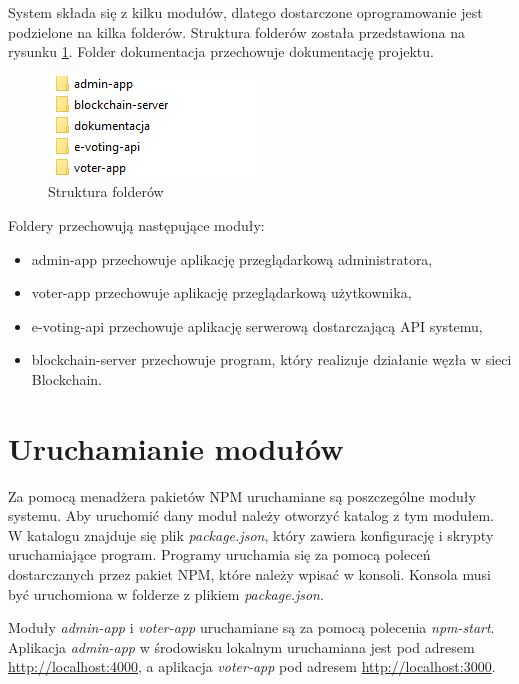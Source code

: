 \documentclass[a4paper,12pt]{book}
\begin{document}
System składa się z kilku modułów, dlatego dostarczone oprogramowanie jest podzielone na kilka folderów. Struktura folderów została przedstawiona na rysunku \ref{foldery}. Folder dokumentacja przechowuje dokumentację projektu.

\begin{figure}[h]
	\centering
	\includegraphics[width=\textwidth]{images/foldery.png}
	\caption{Struktura folderów}\label{foldery}
\end {figure}

Foldery przechowują następujące moduły:
\begin{itemize}
	\item admin-app przechowuje aplikację przeglądarkową administratora,
	\item voter-app przechowuje aplikację przeglądarkową użytkownika,
	\item e-voting-api przechowuje aplikację serwerową dostarczającą API systemu,
	\item blockchain-server przechowuje program, który realizuje działanie węzła w sieci Blockchain.
\end{itemize}

\section{Uruchamianie modułów}

Za pomocą menadżera pakietów NPM uruchamiane są poszczególne moduły systemu. Aby uruchomić dany moduł należy otworzyć katalog z tym modułem. W katalogu znajduje się plik \textit{package.json}, który zawiera konfigurację i skrypty uruchamiające program. Programy uruchamia się za pomocą poleceń dostarczanych przez pakiet NPM, które należy wpisać w konsoli. Konsola musi być uruchomiona w folderze z plikiem \textit{package.json}.

Moduły \textit{admin-app} i \textit{voter-app} uruchamiane są za pomocą polecenia \textit{npm-start}. Aplikacja \textit{admin-app} w środowisku lokalnym uruchamiana jest pod adresem \url{http://localhost:4000}, a aplikacja \textit{voter-app} pod adresem \url{http://localhost:3000}.
\end{document}
